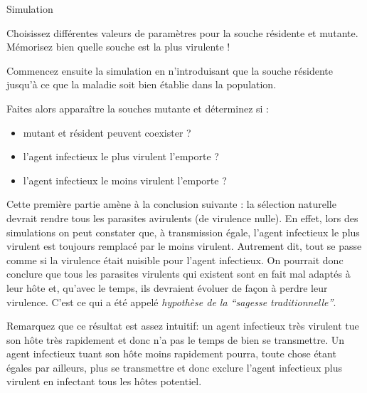 \documentclass[12pt]{article}
\begin{document}
                                                                                                                
\begin{bclogo}[couleur = gray!30, logo = \bclampe , barre =                                                      
none, noborder=true ]{Simulation}                                                                                  

Choisissez différentes valeurs de paramètres pour la souche résidente
et mutante. Mémorisez bien quelle souche est la plus virulente !

Commencez ensuite la simulation en n'introduisant que la souche
résidente jusqu'à ce que la maladie soit bien établie dans la
population.

Faites alors apparaître la souches mutante et déterminez si :

\begin{itemize}
\item mutant et résident peuvent coexister ?
\item l'agent infectieux le plus virulent l'emporte ?
\item l'agent infectieux le moins virulent l'emporte ?
\end{itemize}
 
\end{bclogo}                                                                                                        

\vspace{1cm}

Cette première partie amène à la conclusion suivante : la sélection
naturelle devrait rendre tous les parasites avirulents (de virulence
nulle). En effet, lors des simulations on peut constater que, à
transmission égale, l'agent infectieux le plus virulent est toujours
remplacé par le moins virulent. Autrement dit, tout se passe comme si
la virulence était nuisible pour l'agent infectieux. On pourrait donc
conclure que tous les parasites virulents qui existent sont en fait
mal adaptés à leur hôte et, qu'avec le temps, ils devraient évoluer de
façon à perdre leur virulence. C'est ce qui a été appelé
\emph{hypothèse de la ``sagesse traditionnelle''}.

Remarquez que ce résultat est assez intuitif: un agent infectieux très
virulent tue son hôte très rapidement et donc n'a pas le temps de bien
se transmettre. Un agent infectieux tuant son hôte moins rapidement
pourra, toute chose étant égales par ailleurs, plus se transmettre et
donc exclure l'agent infectieux plus virulent en infectant tous les
hôtes potentiel.
\end{document}
